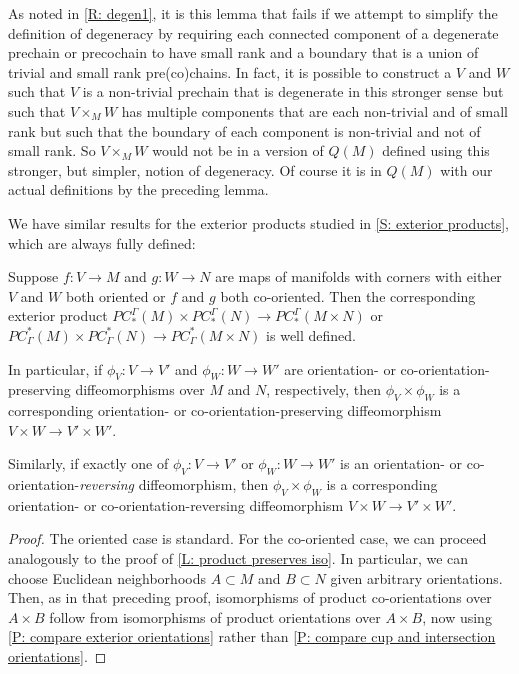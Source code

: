 \begin{remark}\label{R: degen2}
	As noted in \cref{R: degen1}, it is this lemma that fails if we attempt to simplify the definition of degeneracy by requiring each connected component of a degenerate prechain or precochain to have small rank and a boundary that is a union of trivial and small rank pre(co)chains.
	In fact, it is possible to construct a $V$ and $W$ such that $V$ is a non-trivial prechain that is degenerate in this stronger sense but such that $V \times_M W$ has multiple components that are each non-trivial and of small rank but such that the boundary of each component is non-trivial and not of small rank.
	So $V \times_M W$ would not be in a version of $Q(M)$ defined using this stronger, but simpler, notion of degeneracy.
	Of course it is in $Q(M)$ with our actual definitions by the preceding lemma.
\end{remark}

We have similar results for the exterior products studied in \cref{S: exterior products}, which are always fully defined:


\begin{lemma}\label{L: ext product preserves iso}
	Suppose $f \colon V \to M$ and $g \colon W \to N$ are maps of manifolds with corners with either $V$ and $W$ both oriented or $f$ and $g$ both co-oriented.
	Then the corresponding exterior product $PC_*^\Gamma(M) \times PC_*^\Gamma(N) \to PC_*^\Gamma(M \times N)$ or $PC^*_\Gamma(M) \times PC^*_\Gamma(N) \to PC^*_\Gamma(M \times N)$ is well defined.

	In particular, if $\phi_V \colon V \to V'$ and $\phi_W \colon W \to W'$ are orientation- or co-orientation-preserving diffeomorphisms over $M$ and $N$, respectively, then $\phi_V \times \phi_W$ is a corresponding orientation- or co-orientation-preserving diffeomorphism $V \times W \to V' \times W'$.

	Similarly, if exactly one of $\phi_V \colon V \to V'$ or $\phi_W \colon W \to W'$ is an orientation- or co-orientation-\textit{reversing} diffeomorphism, then $\phi_V \times \phi_W$ is a corresponding orientation- or co-orientation-reversing diffeomorphism $V \times W \to V' \times W'$.
\end{lemma}
\begin{proof}
	The oriented case is standard.
	For the co-oriented case, we can proceed analogously to the proof of \cref{L: product preserves iso}.
	In particular, we can choose Euclidean neighborhoods $A \subset M$ and $B \subset N$ given arbitrary orientations.
	Then, as in that preceding proof, isomorphisms of product co-orientations over $A \times B$ follow from isomorphisms of product orientations over $A \times B$, now using \cref{P: compare exterior orientations} rather than \cref{P: compare cup and intersection orientations}.
\end{proof}



